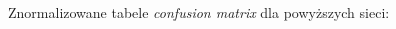 \documentclass[polish,12pt]{aghthesis}
\begin{document}
\noindent Znormalizowane tabele \textit{confusion matrix} dla powyższych sieci:
\begin{figure}[H]%
    \begin{adjustbox}{minipage=1.0\paperwidth, pagecenter}
    \centering
    \qquad
    \end{adjustbox}
\end{figure}
\end{document}
